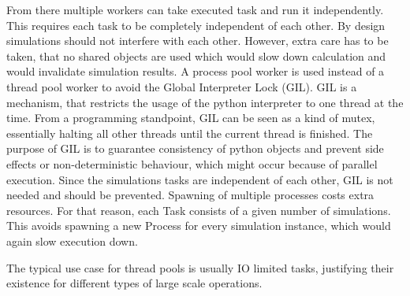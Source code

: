 \documentclass[conference]{IEEEtran}
\begin{document}
From there multiple workers can take executed task and run it independently.
This requires each task to be completely independent of each other.
By design simulations should not interfere with each other.
However, extra care has to be taken, that no shared objects are used which would slow down calculation and would invalidate simulation results.
A process pool worker is used instead of a thread pool worker to avoid the Global Interpreter Lock (GIL).
GIL is a mechanism, that restricts the usage of the python interpreter to one thread at the time.
From a programming standpoint, GIL can be seen as a kind of mutex, essentially halting all other threads until the current thread is finished.
The purpose of GIL is to guarantee consistency of python objects and prevent side effects or non-deterministic behaviour, which might occur because of parallel execution.
Since the simulations tasks are independent of each other, GIL is not needed and should be prevented.
Spawning of multiple processes costs extra resources.
For that reason, each Task consists of a given number of simulations.
This avoids spawning a new Process for every simulation instance, which would again slow execution down.


The typical use case for thread pools is usually IO limited tasks, justifying their existence for different types of large scale operations.\\\\
\end{document}
